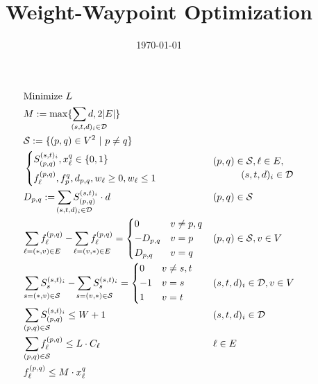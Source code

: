 \documentclass[a4paper,USenglish]{article}
\title{Weight-Waypoint Optimization}
\date{\today}
\newcommand{\sub}[1]{ \hspace{-4ex}\mathrlap{#1} }
\begin{document}
\maketitle

\begin{align}
& \text{Minimize} ~L \nonumber	&&\\
&M := \max \{ \sum_{\sub{(s,t,d)_i \in \mathcal{D}}} d, 2|E| \} &&
\\
&\mathcal{S} := \{(p,q) \in V^2 ~|~  p \neq q \}	&&
\\
&\begin{dcases}
	S^{(s,t)_i}_{(p,q)}, x^{q}_{\ell} \in \{0,1\} \\
	f^{(p,q)}_{\ell}, f^{q}_{p}, d_{p,q}, w_{\ell}  \geq 0, w_{\ell}  \leq 1
\end{dcases}
&&
\begin{multlined}
	  (p,q) \in \mathcal{S}, \ell \in E, \\
	   (s,t,d)_i \in \mathcal{D}
\end{multlined}	 \label{LP:vardef}    
\\
& D_{p,q} := \sum_{\sub{ (s,t,d)_i \in \mathcal{D}}} S^{(s,t)_i}_{(p,q)} \cdot d
&& (p,q) \in \mathcal{S}
\\
&\sum_{\sub{\ell = (*,v) \in E}} f^{(p,q)}_{\ell}  -
	\sum_{\sub{\ell= (v,*) \in E} }f^{(p,q)}_{\ell} =
	\begin{dcases}
	0	&v \neq p,q\\
	- D_{p,q} 	&v=p \\
	D_{p,q} &v=q
	\end{dcases}
&&(p,q) \in \mathcal{S}, v \in V	\label{LP:flowcons}
\\
& \sum_{\sub{ s=(*,v) \in \mathcal{S}}} S^{(s,t)_i}_{s} - 
	 \sum_{\sub{ s=(v,*) \in \mathcal{S}}} S^{(s,t)_i}_{s} =
	 \begin{dcases}
	 	0	& v \neq s,t	\\
	 	-1	&v=s	\\
	 	1	&v=t
	 \end{dcases}
&&(s,t,d)_i \in \mathcal{D}, v \in V		\label{LP:segments}
\\
&\sum_{\sub{(p,q) \in \mathcal{S}}} S^{(s,t)_i}_{(p,q)}  \leq W+1
&&  (s,t,d)_i \in \mathcal{D}
\label{LP:wp_limit} 
\\
& \sum_{\sub{(p,q) \in \mathcal{S}}} f^{(p,q)}_{\ell} \leq L \cdot C_{\ell}
&&  \ell \in E
\\
&   f^{(p,q)}_{\ell} \leq M \cdot x^{q}_{\ell}

\end{align}
\end{document}
